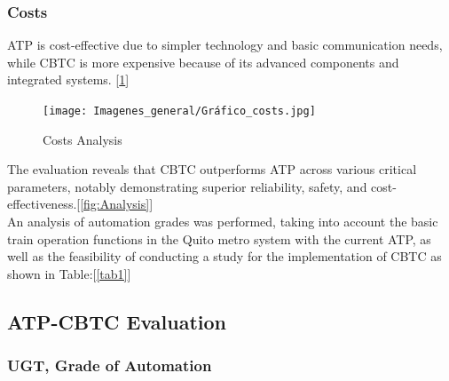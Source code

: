 \documentclass[conference]{IEEEtran}
\begin{document}
\subsubsection{Costs}

ATP is cost-effective due to simpler technology and basic communication needs, while CBTC is more expensive because of its advanced components and integrated systems. [\ref{fig:Costs Analysis}]\\
\begin{figure}[htbp]
    \centering
        \texttt{[image: Imagenes\_general/Gráfico\_costs.jpg]}
    \caption{Costs Analysis}
    \label{fig:Costs Analysis}
\end{figure}

The evaluation reveals that CBTC outperforms ATP across various critical parameters, notably demonstrating superior reliability, safety, and cost-effectiveness.[\ref{fig:Analysis}]\\

An analysis of automation grades was performed, taking into account the basic train operation functions in the Quito metro system with the current ATP, as well as the feasibility of conducting a study for the implementation of CBTC as shown in Table:[\ref{tab1}]\\

\subsection{ATP-CBTC Evaluation}

\subsubsection{UGT, Grade of  Automation}
\end{document}
